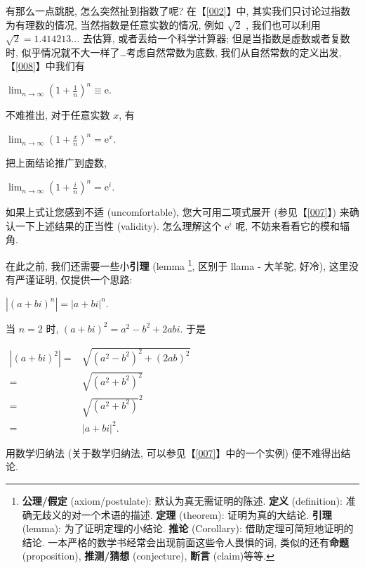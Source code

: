 \begin{tcolorbox}[size=fbox, breakable, enhanced jigsaw, title={复数的指数形式}]

有那么一点跳脱, 怎么突然扯到指数了呢? 在【\ref{002}】中,
其实我们只讨论过指数为有理数的情况, 当然指数是任意实数的情况, 例如
$\sqrt{2}$ , 我们也可以利用 $\sqrt{2}=1.414213...$ 去估算,
或者丢给一个科学计算器; 但是当指数是虚数或者复数时,
似乎情况就不大一样了\ldots 考虑自然常数为底数, 我们从自然常数的定义出发,
【\ref{008}】中我们有

$\lim_{n\rightarrow\infty}\left(1+\frac{1}{n}\right)^n\equiv\mathrm{e}.$

不难推出, 对于任意实数 $x$, 有

$\lim_{n\rightarrow\infty}\left(1+\frac{x}{n}\right)^n=\mathrm{e}^x.$

把上面结论推广到虚数,

$\lim_{n\rightarrow\infty}\left(1+\frac{i}{n}\right)^n=\mathrm{e}^i.$

如果上式让您感到不适 (uncomfortable), 您大可用二项式展开 (参见【\ref{007}】)
来确认一下上述结果的正当性 (validity). 怎么理解这个 $\mathrm{e}^i$ 呢,
不妨来看看它的模和辐角.

在此之前, 我们还需要一些小\textbf{引理} (lemma \footnote{\textbf{公理/假定}
  (axiom/postulate): 默认为真无需证明的陈述. \textbf{定义} (definition):
  准确无歧义的对一个术语的描述. \textbf{定理} (theorem):
  证明为真的大结论. \textbf{引理} (lemma): 为了证明定理的小结论.
  \textbf{推论} (Corollary): 借助定理可简短地证明的结论.
  一本严格的数学书经常会出现前面这些令人畏惧的词,
  类似的还有\textbf{命题} (proposition), \textbf{推测/猜想}
  (conjecture), \textbf{断言} (claim)等等.}, 区别于 llama - 大羊驼,
好冷), 这里没有严谨证明, 仅提供一个思路:

\begin{tcolorbox}[size=fbox, breakable, enhanced jigsaw, title={引理1}]
$\boxed{|(a+bi)^n|=|a+bi|^n}$.
\end{tcolorbox}

\begin{newquote}
当 $n=2$ 时, $(a+bi)^2=a^2-b^2+2abi$. 于是

$\begin{aligned}|(a+bi)^2|=&\sqrt{(a^2-b^2)^2+(2ab)^2}\\=&\sqrt{(a^2+b^2)^2}\\=&\sqrt{(a^2+b^2)}^2\\=&|a+bi|^2.\end{aligned}$

用数学归纳法 (关于数学归纳法, 可以参见【\ref{007}】中的一个实例)
便不难得出结论.
\end{newquote}


\end{tcolorbox}
